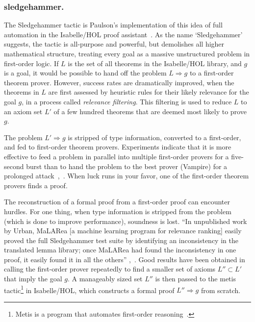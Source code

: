 \documentclass{llncs}
\begin{document}
\subsubsection{sledgehammer.}

The Sledgehammer tactic is Paulson's implementation of this idea of full automation in
the Isabelle/HOL proof assistant~\cite{Paar}.  As the name `Sledgehammer' suggests,
the tactic is all-purpose and powerful, but demolishes all higher
mathematical structure, treating every goal as a massive unstructured
problem in first-order logic.  If $L$ is the set of all theorems in
the Isabelle/HOL library, and $g$ is a goal, it would be possible to hand
off the problem $L\Longrightarrow g$ to a first-order theorem
prover.  However, success rates are dramatically improved, when the
theorems in $L$ are first assessed by heuristic rules for their likely
relevance for the goal $g$, in a process called {\it relevance
  filtering}. 
This filtering is used to reduce $L$ to an axiom set $L'$ of a
few hundred theorems that are deemed most likely to prove $g$.

The problem $L'\Longrightarrow g$ is stripped of type information,
converted to a first-order, and fed to
first-order theorem provers. Experiments indicate that
it is more effective to feed a problem in parallel into multiple
first-order provers for a five-second burst than to hand the problem
to the best prover (Vampire) for a prolonged attack~\cite{Paar},~\cite{Boehme-Nipkow-IJCAR10}.
%
When luck runs in your favor, one of the first-order theorem provers
finds a proof.

The reconstruction of a formal proof from a first-order proof can
encounter hurdles.  For one thing, when type information is stripped
from the problem (which is done to improve performance), soundness is
lost.  ``In unpublished work by Urban, MaLARea [a machine learning
program for relevance ranking] easily proved the full Sledgehammer
test suite by identifying an inconsistency in the translated lemma
library; once MaLARea had found the inconsistency in one proof, it
easily found it in all the others'' \cite{Paar},~\cite{UrM}.
Good results have been obtained in calling the first-order prover
repeatedly to find a smaller set of axioms $L''\subset L'$ that imply
the goal $g$. A manageably sized set $L''$ is then passed to the metis
tactic\footnote{Metis is a program that automates first-order
  reasoning~\cite{Metis}.} in Isabelle/HOL, which
constructs a formal proof $L''\Longrightarrow g$ from scratch.
\end{document}
